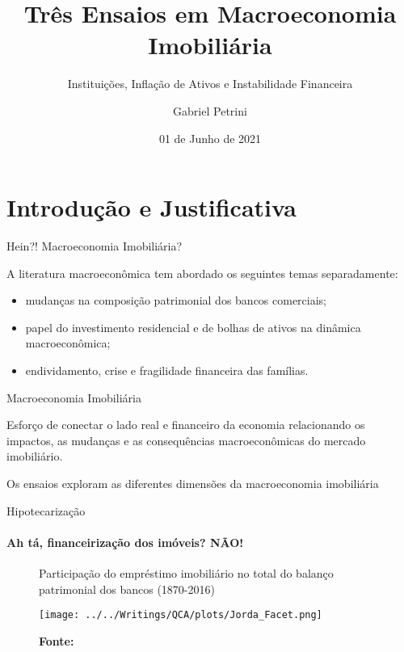 \documentclass[11pt]{beamer}
\author{Gabriel Petrini}
\title{Três Ensaios em Macroeconomia Imobiliária}
\subtitle{Instituições, Inflação de Ativos e Instabilidade Financeira}
\institute{IE/Unicamp}
\date{01 de Junho de 2021}
\begin{document}
\begin{frame}[plain]
	\maketitle
\end{frame}

\section[Introdução]{Introdução e Justificativa}

\begin{frame}{Hein?! Macroeconomia Imobiliária?}

A literatura macroeconômica tem abordado os seguintes temas separadamente:

\begin{itemize}
    \item mudanças na composição patrimonial dos bancos comerciais;
    \item papel do investimento residencial e de bolhas de ativos na dinâmica macroeconômica;
    \item endividamento, crise e fragilidade financeira das famílias.
\end{itemize}

\begin{alert}{Macroeconomia Imobiliária}

Esforço de conectar o lado real e financeiro da economia relacionando os impactos, as mudanças e as consequências macroeconômicas do mercado imobiliário.

Os ensaios exploram as diferentes dimensões da macroeconomia imobiliária
\end{alert}

\end{frame}

\begin{frame}{Hipotecarização}
\framesubtitle{Ah tá, financeirização dos imóveis? NÃO!}

\begin{figure}[H]
	\centering
	\caption{Participação do empréstimo imobiliário no total do balanço patrimonial dos bancos (1870-2016)}
	\label{GraficoJorda}
	\texttt{[image: ../../Writings/QCA/plots/Jorda\_Facet.png]}
	\caption*{\textbf{Fonte:} \textcite{jorda_rate_2019}}
\end{figure}

\end{frame}
\end{document}
